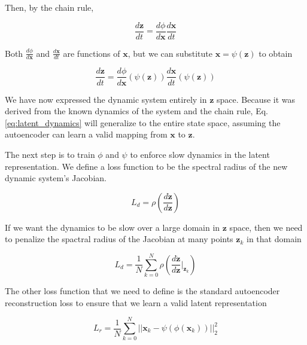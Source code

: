 \documentclass[12pt, letterpaper]{article}
\begin{document}
Then, by the chain rule,

\begin{equation}
    \frac{d\mathbf{z}}{dt} = \frac{d \phi}{d \mathbf{x}} \frac{d \mathbf{x}}{dt} 
\end{equation}

Both $\frac{d \phi}{d \mathbf{x}}$ and $\frac{d \mathbf{x}}{dt}$ are functions of $\mathbf{x}$, but we can substitute $\mathbf{x} = \psi(\mathbf{z})$ to obtain

\begin{equation}
    \label{eq:latent_dynamics}
    \frac{d\mathbf{z}}{dt} = \frac{d \phi}{d \mathbf{x}} \left( \psi(\mathbf{z}) \right) \frac{d \mathbf{x}}{dt}\left( \psi(\mathbf{z}) \right) 
\end{equation}

We have now expressed the dynamic system entirely in $\mathbf{z}$ space.  Because it was derived from the known dynamics of the system and the chain rule, Eq. \ref{eq:latent_dynamics} will generalize to the entire state space, assuming the autoencoder can learn a valid mapping from $\mathbf{x}$ to $\mathbf{z}$. 

The next step is to train $\phi$ and $\psi$ to enforce slow dynamics in the latent representation. We define a loss function to be the spectral radius of the new dynamic system's Jacobian. 

\begin{equation}
    L_d = \rho\left( \frac{d \dot{\mathbf{z}}}{d \mathbf{z}} \right) 
\end{equation}

If we want the dynamics to be slow over a large domain in $\mathbf{z}$ space, then we need to penalize the spactral radius of the Jacobian at many points $\mathbf{z}_k$ in that domain

\begin{equation}
    L_d = \frac{1}{N} \overset{N}{\underset{k=0}{\sum}} \rho\left( \frac{d \dot{\mathbf{z}}}{d \mathbf{z}} \Big|_{\mathbf{z}_k} \right) 
\end{equation}

The other loss function that we need to define is the standard autoencoder reconstruction loss to ensure that we learn a valid latent representation

\begin{equation}
    L_r = \frac{1}{N} \overset{N}{\underset{k=0}{\sum}} ||\mathbf{x}_k - \psi(\phi(\mathbf{x}_k))||_2^2
\end{equation}
\end{document}
